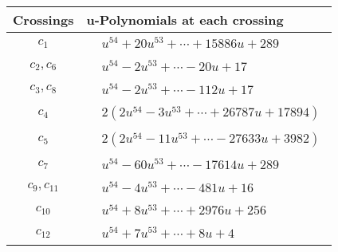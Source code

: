 \documentclass[1p]{elsarticle_modified}
\theoremstyle{definition}
\begin{document}
\begin{tabular}{m{50pt}|m{274pt}}
Crossings & \hspace{64pt}u-Polynomials at each crossing \\
\hline $$\begin{aligned}c_{1}\end{aligned}$$&$\begin{aligned}
&u^{54}+20 u^{53}+\cdots+15886 u+289
\end{aligned}$\\
\hline $$\begin{aligned}c_{2},c_{6}\end{aligned}$$&$\begin{aligned}
&u^{54}-2 u^{53}+\cdots-20 u+17
\end{aligned}$\\
\hline $$\begin{aligned}c_{3},c_{8}\end{aligned}$$&$\begin{aligned}
&u^{54}-2 u^{53}+\cdots-112 u+17
\end{aligned}$\\
\hline $$\begin{aligned}c_{4}\end{aligned}$$&$\begin{aligned}
&2(2 u^{54}-3 u^{53}+\cdots+26787 u+17894)
\end{aligned}$\\
\hline $$\begin{aligned}c_{5}\end{aligned}$$&$\begin{aligned}
&2(2 u^{54}-11 u^{53}+\cdots-27633 u+3982)
\end{aligned}$\\
\hline $$\begin{aligned}c_{7}\end{aligned}$$&$\begin{aligned}
&u^{54}-60 u^{53}+\cdots-17614 u+289
\end{aligned}$\\
\hline $$\begin{aligned}c_{9},c_{11}\end{aligned}$$&$\begin{aligned}
&u^{54}-4 u^{53}+\cdots-481 u+16
\end{aligned}$\\
\hline $$\begin{aligned}c_{10}\end{aligned}$$&$\begin{aligned}
&u^{54}+8 u^{53}+\cdots+2976 u+256
\end{aligned}$\\
\hline $$\begin{aligned}c_{12}\end{aligned}$$&$\begin{aligned}
&u^{54}+7 u^{53}+\cdots+8 u+4
\end{aligned}$\\
\hline
\end{tabular}\\~\\
\end{document}
